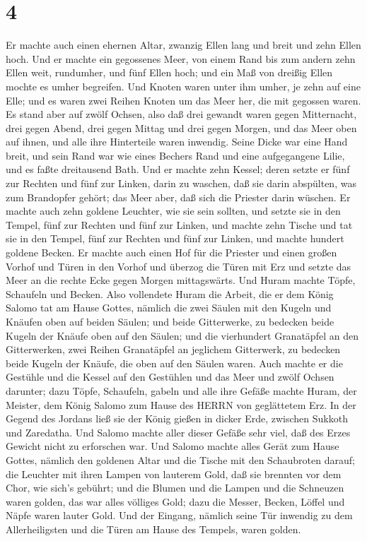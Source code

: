 \hypertarget{section-3}{%
\section{4}\label{section-3}}

 Er machte auch einen ehernen Altar, zwanzig Ellen lang und
breit und zehn Ellen hoch.  Und er machte ein gegossenes
Meer, von einem Rand bis zum andern zehn Ellen weit, rundumher, und fünf
Ellen hoch; und ein Maß von dreißig Ellen mochte es umher begreifen.
 Und Knoten waren unter ihm umher, je zehn auf eine Elle;
und es waren zwei Reihen Knoten um das Meer her, die mit gegossen waren.
 Es stand aber auf zwölf Ochsen, also daß drei gewandt waren
gegen Mitternacht, drei gegen Abend, drei gegen Mittag und drei gegen
Morgen, und das Meer oben auf ihnen, und alle ihre Hinterteile waren
inwendig.  Seine Dicke war eine Hand breit, und sein Rand
war wie eines Bechers Rand und eine aufgegangene Lilie, und es faßte
dreitausend Bath.  Und er machte zehn Kessel; deren setzte
er fünf zur Rechten und fünf zur Linken, darin zu waschen, daß sie darin
abspülten, was zum Brandopfer gehört; das Meer aber, daß sich die
Priester darin wüschen.  Er machte auch zehn goldene
Leuchter, wie sie sein sollten, und setzte sie in den Tempel, fünf zur
Rechten und fünf zur Linken,  und machte zehn Tische und tat
sie in den Tempel, fünf zur Rechten und fünf zur Linken, und machte
hundert goldene Becken.  Er machte auch einen Hof für die
Priester und einen großen Vorhof und Türen in den Vorhof und überzog die
Türen mit Erz  und setzte das Meer an die rechte Ecke gegen
Morgen mittagswärts.  Und Huram machte Töpfe, Schaufeln und
Becken. Also vollendete Huram die Arbeit, die er dem König Salomo tat am
Hause Gottes,  nämlich die zwei Säulen mit den Kugeln und
Knäufen oben auf beiden Säulen; und beide Gitterwerke, zu bedecken beide
Kugeln der Knäufe oben auf den Säulen;  und die vierhundert
Granatäpfel an den Gitterwerken, zwei Reihen Granatäpfel an jeglichem
Gitterwerk, zu bedecken beide Kugeln der Knäufe, die oben auf den Säulen
waren.  Auch machte er die Gestühle und die Kessel auf den
Gestühlen  und das Meer und zwölf Ochsen darunter;
 dazu Töpfe, Schaufeln, gabeln und alle ihre Gefäße machte
Huram, der Meister, dem König Salomo zum Hause des HERRN von geglättetem
Erz.  In der Gegend des Jordans ließ sie der König gießen
in dicker Erde, zwischen Sukkoth und Zaredatha.  Und Salomo
machte aller dieser Gefäße sehr viel, daß des Erzes Gewicht nicht zu
erforschen war.  Und Salomo machte alles Gerät zum Hause
Gottes, nämlich den goldenen Altar und die Tische mit den Schaubroten
darauf;  die Leuchter mit ihren Lampen von lauterem Gold,
daß sie brennten vor dem Chor, wie sich's gebührt;  und die
Blumen und die Lampen und die Schneuzen waren golden, das war alles
völliges Gold;  dazu die Messer, Becken, Löffel und Näpfe
waren lauter Gold. Und der Eingang, nämlich seine Tür inwendig zu dem
Allerheiligsten und die Türen am Hause des Tempels, waren golden.

